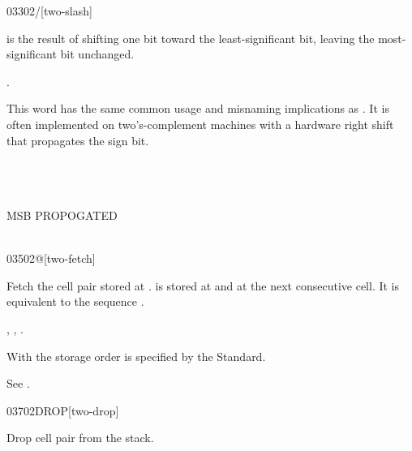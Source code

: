 \begin{worddef}{0330}{2/}[two-slash]
\item {}

	 is the result of shifting  one bit toward
	the least-significant bit, leaving the most-significant bit
	unchanged.

\see {}.

	\begin{rationale} %
		This word has the same common usage and misnaming implications
		as . It is often implemented on two's-complement
		machines with a hardware right shift that propagates the sign
		bit.
	\end{rationale}

	\begin{testing} %
		 \\
		 \\
		 \\
		  MSB PROPOGATED \\
		 \\
	\end{testing}
\end{worddef}


\begin{worddef}{0350}{2@}[two-fetch]
\item {}

	Fetch the cell pair  stored at .
	 is stored at  and  at the
	next consecutive cell. It is equivalent to the sequence
	    .

\see {},
	,
	.

	\begin{rationale} %
		With  the storage order is specified by the Standard.
	\end{rationale}

	\begin{testing} %
		See .
	\end{testing}
\end{worddef}


\begin{worddef}{0370}{2DROP}[two-drop]
\item {}

	Drop cell pair  from the stack.

	\begin{testing} %
	\end{testing}
\end{worddef}



